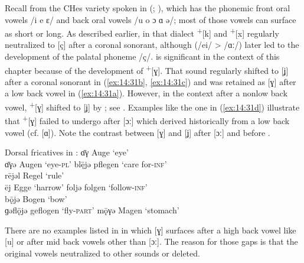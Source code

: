 Recall from  the CHes variety spoken in  (\citealt{Kroh1915}; ), which has the phonemic front oral vowels /i e ɛ/ and back oral vowels /u o ɔ ɑ ə/; most of those vowels can surface as short or long. As described earlier, in that dialect  \textsuperscript{+}[k] and \textsuperscript{+}[x] regularly neutralized to [ç] after a coronal sonorant, although  (/ei/ > /ɑː/) later led to the development of the palatal phoneme /ç/.  is significant in the context of this chapter because of the development of  \textsuperscript{+}[ɣ]. That sound regularly shifted to [ʝ] after a coronal sonorant in (\ref{ex:14:31b}, \ref{ex:14:31c}) and was retained as [ɣ] after a low back vowel in (\ref{ex:14:31a}). However, in the context after a nonlow back vowel,   \textsuperscript{+}[ɣ] shifted to [ʝ] by ; see . Examples like the one in (\ref{ex:14:31d}) illustrate that  \textsuperscript{+}[ɣ] failed to undergo  after [ɔː] which derived historically from a low back vowel (cf.  [ɑ]). Note the contrast between [ɣ] and [ʝ] after [ɔː] and before .


\ea%
\label{ex:14:31}Dorsal fricatives in :
\ea\label{ex:14:31a} ɑ̄γ \tab [ɑːɣ]  \tab  Auge \tab ‘eye’  \\
    ɑ̄γə \tab [ɑːɣə] \tab Augen \tab ‘eye-\textsc{pl}’  
\ex\label{ex:14:31b} bl\={ę}jə \tab [plɛːʝə] \tab pflegen \tab ‘care for\textsc{{}-inf}’ \\
    rējəl \tab [reːʝəl] \tab Regel \tab ‘rule’  \\
    ēj \tab [eːʝ]  \tab  Egge \tab ‘harrow’  
\ex\label{ex:14:31c} foljə \tab [folːʝə] \tab folgen \tab ‘follow\textsc{{}-inf}’ \\
    bǭjə \tab [bɔːʝə] \tab Bogen \tab ‘bow’  \\
    ɡəflǭjə \tab [gəflɔːʝə] \tab geflogen \tab ‘fly\textsc{{}-part}’ 
\ex\label{ex:14:31d} mǭγə \tab [mɔːɣə] \tab Magen \tab ‘stomach’ 
\z
\z 

There are no examples listed in \citet{Kroh1915} in which [ɣ] surfaces after a high back vowel like [u] or after mid back vowels other than [ɔː]. The reason for those gaps is that the original  vowels neutralized to other sounds or deleted.

